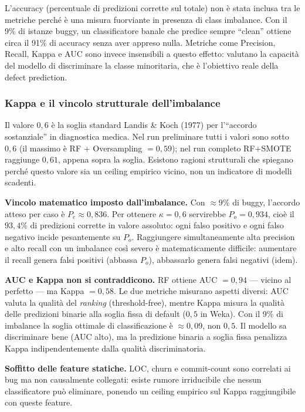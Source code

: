 L'accuracy (percentuale di predizioni corrette sul totale) non è stata inclusa tra le
metriche perché è una misura fuorviante in presenza di class imbalance. Con il 9\% di
istanze buggy, un classificatore banale che predice sempre ``clean'' ottiene circa il
91\% di accuracy senza aver appreso nulla. Metriche come Precision, Recall, Kappa e AUC
sono invece insensibili a questo effetto: valutano la capacità del modello di discriminare
la classe minoritaria, che è l'obiettivo reale della defect prediction.

\subsubsection{Kappa e il vincolo strutturale dell'imbalance}

Il valore $0{,}6$ è la soglia standard Landis \& Koch (1977) per l'``accordo sostanziale''
in diagnostica medica. Nel run preliminare tutti i valori sono sotto $0{,}6$ (il massimo è
RF + Oversampling $= 0{,}59$); nel run completo RF+SMOTE raggiunge $0{,}61$, appena sopra
la soglia. Esistono ragioni strutturali che spiegano perché questo valore sia un ceiling
empirico vicino, non un indicatore di modelli scadenti.

\textbf{Vincolo matematico imposto dall'imbalance.} Con $\approx$9\% di buggy, l'accordo
atteso per caso è $P_e \approx 0{,}836$. Per ottenere $\kappa = 0{,}6$ servirebbe
$P_o = 0{,}934$, cioè il $93{,}4\%$ di predizioni corrette in valore assoluto: ogni
falso positivo e ogni falso negativo incide pesantemente su $P_o$. Raggiungere
simultaneamente alta precision e alto recall con un imbalance così severo è
matematicamente difficile: aumentare il recall genera falsi positivi (abbassa $P_o$),
abbassarlo genera falsi negativi (idem).

\textbf{AUC e Kappa non si contraddicono.} RF ottiene AUC $= 0{,}94$ --- vicino al
perfetto --- ma Kappa $= 0{,}58$. Le due metriche misurano aspetti diversi: AUC valuta
la qualità del \textit{ranking} (threshold-free), mentre Kappa misura la qualità delle
predizioni binarie alla soglia fissa di default ($0{,}5$ in Weka). Con il 9\% di imbalance
la soglia ottimale di classificazione è $\approx 0{,}09$, non $0{,}5$. Il modello sa
discriminare bene (AUC alto), ma la predizione binaria a soglia fissa penalizza Kappa
indipendentemente dalla qualità discriminatoria.

\textbf{Soffitto delle feature statiche.} LOC, churn e commit-count sono correlati ai
bug ma non causalmente collegati: esiste rumore irriducibile che nessun classificatore
può eliminare, ponendo un ceiling empirico sul Kappa raggiungibile con queste feature.

